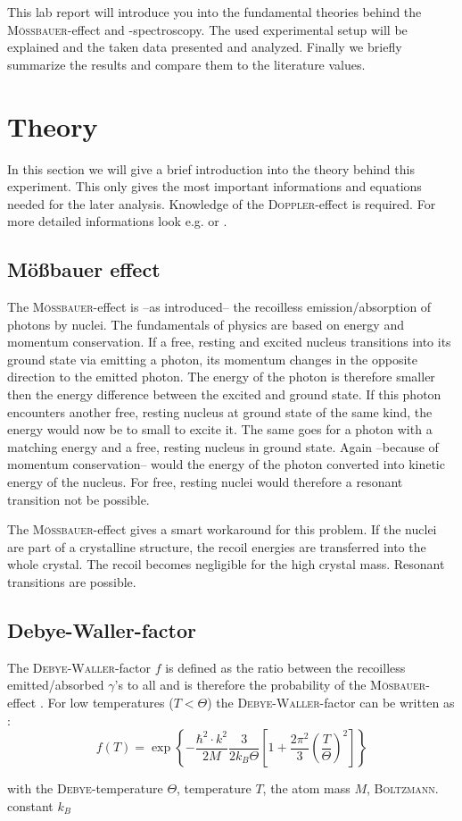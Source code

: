 \documentclass[11pt,a4paper,notitlepage]{scrartcl}
\begin{document}
This lab report will introduce you into the fundamental theories behind the \textsc{Mö\ss bauer}-effect and -spectroscopy. The used experimental setup will be explained and the taken data presented and analyzed. Finally we briefly summarize the results and compare them to the literature values.
\newpage

\section{Theory}\label{sec:theory}
In this section we will give a brief introduction into the theory behind this experiment. This only gives the most important informations and equations needed for the later analysis. Knowledge of the \textsc{Doppler}-effect is required. For more detailed informations look e.g. \cite{chemistry} or \cite{schatz}.
\subsection{Mö\ss bauer effect}
The \textsc{Mö\ss bauer}-effect is --as introduced-- the recoilless emission/absorption of photons by nuclei. The fundamentals of physics are based on energy and momentum conservation. If a free, resting and excited nucleus transitions into its ground state via emitting a photon, its momentum changes in the opposite direction to the emitted photon. The energy of the photon is therefore smaller then the energy difference between the excited and ground state. If this photon encounters another free, resting nucleus at ground state of the same kind, the energy would now be to small to excite it. The same goes for a photon with a matching energy and a free, resting nucleus in ground state. Again --because of momentum conservation-- would the energy of the photon converted into kinetic energy of the nucleus. For free, resting nuclei would therefore a resonant transition not be possible.

The \textsc{Mö\ss bauer}-effect gives a smart workaround for this problem. If the nuclei are part of a crystalline structure, the recoil energies are transferred into the whole crystal. The recoil becomes negligible for the high crystal mass. Resonant transitions are possible. \cite{chemistry}
\subsection{Debye-Waller-factor}\label{sec:debye}
The \textsc{Debye-Waller}-factor $f$ is defined as the ratio between the recoilless emitted/absorbed $\gamma$'s to all and is therefore the probability of the \textsc{Mösbauer}-effect \cite{chemistry}. For low temperatures ($T<\Theta$) the \textsc{Debye-Waller}-factor can be written as \cite{schatz}:
\begin{equation*}
	f(T)=\exp\left\{-\frac{\hbar^2\cdot k^2}{2M}\frac{3}{2k_B\Theta}\left[1+\frac{2\pi^2}{3}\left(\frac{T}{\Theta}\right)^2\right]\right\}
\end{equation*}
\begin{center}
		with the \textsc{Debye}-temperature $\Theta$, temperature $T$, the atom mass $M$, \textsc{Boltzmann}. constant $k_B$
\end{center}
\end{document}
